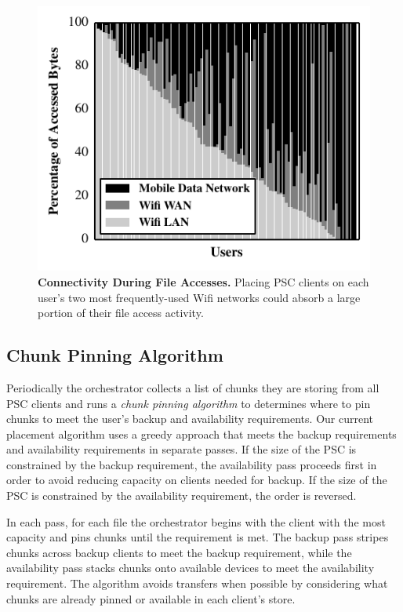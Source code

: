 \begin{figure}[t]

  \includegraphics{./figures/pocketlocker/ConnectivityPercentageGraph.pdf}

  \caption{\small \textbf{Connectivity During File Accesses.} Placing PSC
    clients on each user's two most frequently-used Wifi networks could absorb a
  large portion of their file access activity.}

  \label{fig-simulation-connectivity}
  
  \vspace*{-0.2in}
\end{figure}
\subsection{Chunk Pinning Algorithm}
\label{sec-design-algorithm}

Periodically the orchestrator collects a list of chunks they are storing from
all PSC clients and runs a \textit{chunk pinning algorithm} to determines
where to pin chunks to meet the user's backup and availability requirements.
Our current placement algorithm uses a greedy approach that meets the backup
requirements and availability requirements in separate passes. If the size of
the PSC is constrained by the backup requirement, the availability pass
proceeds first in order to avoid reducing capacity on clients needed for
backup. If the size of the PSC is constrained by the availability
requirement, the order is reversed.

In each pass, for each file the orchestrator begins with the client with the
most capacity and pins chunks until the requirement is met. The backup pass
stripes chunks across backup clients to meet the backup requirement, while the
availability pass stacks chunks onto available devices to meet the availability
requirement. The algorithm avoids transfers when possible by considering what
chunks are already pinned or available in each client's store.

